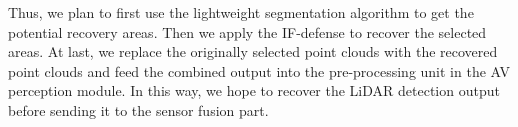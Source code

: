 Thus, we plan to first use the lightweight segmentation algorithm to get the potential recovery areas.
Then we apply the IF-defense\cite{if-defense} to recover the selected areas.
At last, we replace the originally selected point clouds with the recovered point clouds and feed the combined output into the pre-processing unit in the AV perception module. 
In this way, we hope to recover the LiDAR detection output before sending it to the sensor fusion part.
